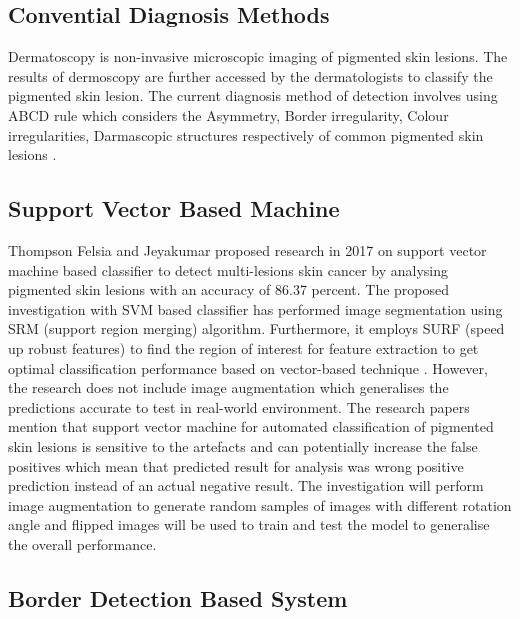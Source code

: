 \subsection{Convential Diagnosis Methods}
Dermatoscopy is non-invasive microscopic imaging of pigmented skin lesions. The results of dermoscopy are further accessed by the dermatologists to classify the pigmented skin lesion. The current diagnosis method of detection involves using ABCD rule which considers the Asymmetry, Border irregularity, Colour irregularities, Darmascopic structures respectively of 
common pigmented skin lesions \citep*{LOESCHER2013170}.

\subsection{Support Vector Based Machine}
Thompson Felsia and Jeyakumar proposed research in 2017 on 
support vector machine based classifier to detect multi-lesions skin cancer by analysing pigmented skin lesions with an accuracy of 86.37 percent.
The proposed investigation with SVM based classifier has performed image segmentation using SRM (support region merging) algorithm. Furthermore, it employs SURF (speed up robust features) to find the region 
of interest for feature extraction to get optimal classification performance based on vector-based technique \citep*{thompson2017vector}. 
However, the research does not include image augmentation which generalises the predictions accurate to test in 
real-world environment. The research papers mention that support vector machine for automated classification of pigmented skin lesions is sensitive to the artefacts and can 
potentially increase the false positives which mean that predicted result for analysis was wrong positive prediction instead of an actual negative result. The investigation will perform image augmentation to generate random 
samples of images with different rotation angle and flipped images will be used to train and test the model to generalise the overall performance.

\subsection{Border Detection Based System}